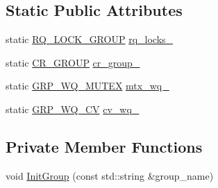 \subsection*{Static Public Attributes}
\begin{DoxyCompactItemize}
\item 
static \hyperlink{namespaceapollo_1_1cyber_1_1scheduler_ad4f939996840b0f02dafc9a779dfefd7}{R\-Q\-\_\-\-L\-O\-C\-K\-\_\-\-G\-R\-O\-U\-P} \hyperlink{classapollo_1_1cyber_1_1scheduler_1_1ClassicContext_a10adfb1632c4cb5049273262cb997333}{rq\-\_\-locks\-\_\-}
\item 
static \hyperlink{namespaceapollo_1_1cyber_1_1scheduler_aea5742ba3cc52566de1eeeeaac1a8714}{C\-R\-\_\-\-G\-R\-O\-U\-P} \hyperlink{classapollo_1_1cyber_1_1scheduler_1_1ClassicContext_a22519e2ac14bf14f0b81e4a3a3befcfb}{cr\-\_\-group\-\_\-}
\item 
static \hyperlink{namespaceapollo_1_1cyber_1_1scheduler_a38dec21bb0dcc34727c9a215020abb70}{G\-R\-P\-\_\-\-W\-Q\-\_\-\-M\-U\-T\-E\-X} \hyperlink{classapollo_1_1cyber_1_1scheduler_1_1ClassicContext_a48ad41105f3adbc71ca925a08ff987ee}{mtx\-\_\-wq\-\_\-}
\item 
static \hyperlink{namespaceapollo_1_1cyber_1_1scheduler_aaaf29077b955c494a8b6ef756e02ed4d}{G\-R\-P\-\_\-\-W\-Q\-\_\-\-C\-V} \hyperlink{classapollo_1_1cyber_1_1scheduler_1_1ClassicContext_abc70c8c180700b17f5048020f21b6fd0}{cv\-\_\-wq\-\_\-}
\end{DoxyCompactItemize}
\subsection*{Private Member Functions}
\begin{DoxyCompactItemize}
\item 
void \hyperlink{classapollo_1_1cyber_1_1scheduler_1_1ClassicContext_a2f4f0b6749ceb22e645c8ca2567f903a}{Init\-Group} (const std\-::string \&group\-\_\-name)
\end{DoxyCompactItemize}
